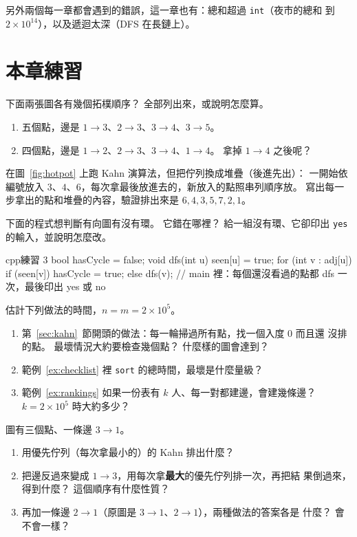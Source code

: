 另外兩個每一章都會遇到的錯誤，這一章也有：總和超過 \texttt{int}（夜市的總和
到 $2 \times 10^{14}$），以及遞迴太深（DFS 在長鏈上）。

\section{本章練習}
\label{sec:ch6-exercises}

\begin{drills}[label=drills:ch6]
\item 下面兩張圖各有幾個拓樸順序？ 全部列出來，或說明怎麼算。
\begin{enumerate}
\item 五個點，邊是 $1 \to 3$、$2 \to 3$、$3 \to 4$、$3 \to 5$。
\item 四個點，邊是 $1 \to 2$、$2 \to 3$、$3 \to 4$、$1 \to 4$。 拿掉
$1 \to 4$ 之後呢？
\end{enumerate}

\item 在圖~\ref{fig:hotpot} 上跑 Kahn 演算法，但把佇列換成堆疊（後進先出）：
一開始依編號放入 $3$、$4$、$6$，每次拿最後放進去的，新放入的點照串列順序放。
寫出每一步拿出的點和堆疊的內容，驗證排出來是 $6, 4, 3, 5, 7, 2, 1$。

\item 下面的程式想判斷有向圖有沒有環。 它錯在哪裡？ 給一組沒有環、它卻印出
\texttt{yes} 的輸入，並說明怎麼改。
\begin{code}{cpp}{練習 3}
bool hasCycle = false;
void dfs(int u) {
    seen[u] = true;
    for (int v : adj[u]) {
        if (seen[v]) {
            hasCycle = true;
        } else {
            dfs(v);
        }
    }
}
// main 裡：每個還沒看過的點都 dfs 一次，最後印出 yes 或 no
\end{code}

\item 估計下列做法的時間，$n = m = 2 \times 10^5$。
\begin{enumerate}
\item 第~\ref{sec:kahn}~節開頭的做法：每一輪掃過所有點，找一個入度 $0$ 而且還
沒排的點。 最壞情況大約要檢查幾個點？ 什麼樣的圖會達到？
\item 範例~\ref{ex:checklist} 裡 \texttt{sort} 的總時間，最壞是什麼量級？
\item 範例~\ref{ex:rankings} 如果一份表有 $k$ 人、每一對都建邊，會建幾條邊？
$k = 2 \times 10^5$ 時大約多少？
\end{enumerate}

\item 圖有三個點、一條邊 $3 \to 1$。
\begin{enumerate}
\item 用優先佇列（每次拿最小的）的 Kahn 排出什麼？
\item 把邊反過來變成 $1 \to 3$，用每次拿\textbf{最大}的優先佇列排一次，再把結
果倒過來，得到什麼？ 這個順序有什麼性質？
\item 再加一條邊 $2 \to 1$（原圖是 $3 \to 1$、$2 \to 1$），兩種做法的答案各是
什麼？ 會不會一樣？
\end{enumerate}


\end{drills}
